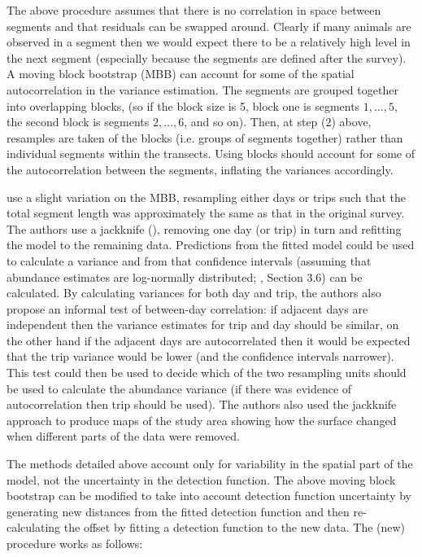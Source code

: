 \documentclass[a4paper,12pt]{article}
\begin{document}
The above procedure assumes that there is no correlation in space between segments and that residuals can be swapped around. Clearly if many animals are observed in a segment then we would expect there to be a relatively high level in the next segment (especially because the segments are defined after the survey). A moving block bootstrap (MBB) can account for some of the spatial autocorrelation in the variance estimation. The segments are grouped together into overlapping blocks, (so if the block size is 5, block one is segments $1,\ldots,5$, the second block is segments $2,\ldots,6$, and so on). Then, at step (2) above, resamples are taken of the blocks (i.e. groups of segments together) rather than individual segments within the transects. Using blocks should account for some of the autocorrelation between the segments, inflating the variances accordingly.

\cite{Williams:2006tz} use a slight variation on the MBB, resampling either days or trips such that the total segment length was approximately the same as that in the original survey. The authors use a jackknife (\cite{Efron:1979ha}), removing one day (or trip) in turn and refitting the model to the remaining data. Predictions from the fitted model could be used to calculate a variance and from that confidence intervals (assuming that abundance estimates are log-normally distributed; \cite{Buckland:2001vm}, Section 3.6) can be calculated. By calculating variances for both day and trip, the authors also propose an informal test of between-day correlation: if adjacent days are independent then the variance estimates for trip and day should be similar, on the other hand if the adjacent days are autocorrelated then it would be expected that the trip variance would be lower (and the confidence intervals narrower). This test could then be used to decide which of the two resampling units should be used to calculate the abundance variance (if there was evidence of autocorrelation then trip should be used). The authors also used the jackknife approach to produce maps of the study area showing how the surface changed when different parts of the data were removed.

The methods detailed above account only for variability in the spatial part of the model, not the uncertainty in the detection function. The above moving block bootstrap can be modified to take into account detection function uncertainty by generating new distances from the fitted detection function and then re-calculating the offset by fitting a detection function to the new data. The (new) procedure works as follows:
\end{document}
